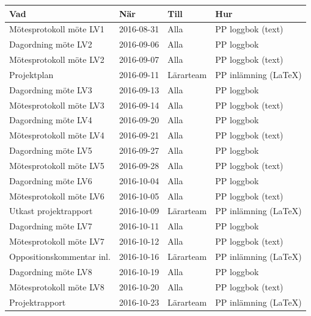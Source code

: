 \documentclass[a4paper]{article}
\begin{document}
\begin{tabular}{|l|l|l|l|} \hline
\bf Vad                  & \bf När    & \bf Till  & \bf Hur               \\ \hline \hline
Mötesprotokoll möte LV1  & 2016-08-31 & Alla      & PP loggbok   (text)  \\ \hline
Dagordning möte LV2      & 2016-09-06 & Alla      & PP loggbok           \\ \hline
Mötesprotokoll möte LV2  & 2016-09-07 & Alla      & PP loggbok   (text)  \\ \hline
Projektplan              & 2016-09-11 & Lärarteam & PP inlämning (LaTeX) \\ \hline
Dagordning möte LV3      & 2016-09-13 & Alla      & PP loggbok           \\ \hline
Mötesprotokoll möte LV3  & 2016-09-14 & Alla      & PP loggbok   (text)  \\ \hline
Dagordning möte LV4      & 2016-09-20 & Alla      & PP loggbok           \\ \hline
Mötesprotokoll möte LV4  & 2016-09-21 & Alla      & PP loggbok   (text)  \\ \hline
Dagordning möte LV5      & 2016-09-27 & Alla      & PP loggbok           \\ \hline
Mötesprotokoll möte LV5  & 2016-09-28 & Alla      & PP loggbok   (text)  \\ \hline
Dagordning möte LV6      & 2016-10-04 & Alla      & PP loggbok           \\ \hline
Mötesprotokoll möte LV6  & 2016-10-05 & Alla      & PP loggbok   (text)  \\ \hline
Utkast projektrapport    & 2016-10-09 & Lärarteam & PP inlämning (LaTeX) \\ \hline
Dagordning möte LV7      & 2016-10-11 & Alla      & PP loggbok           \\ \hline
Mötesprotokoll möte LV7  & 2016-10-12 & Alla      & PP loggbok   (text)  \\ \hline
Oppositionskommentar inl.& 2016-10-16 & Lärarteam & PP inlämning (LaTeX) \\ \hline
Dagordning möte LV8      & 2016-10-19 & Alla      & PP loggbok           \\ \hline
Mötesprotokoll möte LV8  & 2016-10-20 & Alla      & PP loggbok   (text)  \\ \hline
Projektrapport           & 2016-10-23 & Lärarteam & PP inlämning (LaTeX) \\ \hline

\end{tabular}
\end{document}
